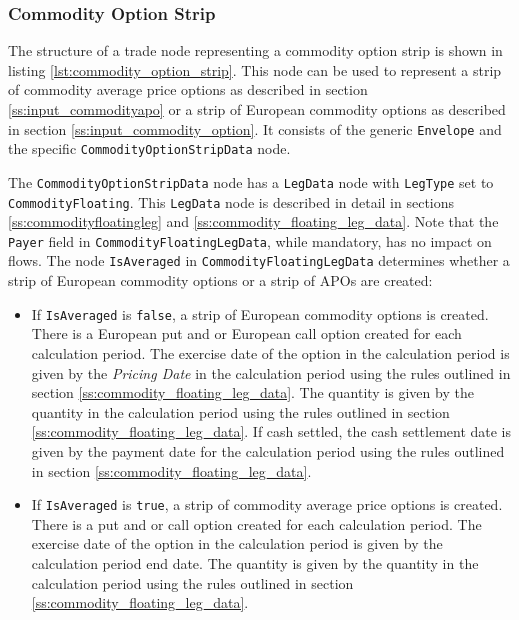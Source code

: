 \subsubsection{Commodity Option Strip}
\label{ss:commodityoptionstrip}

The structure of a trade node representing a commodity option strip is shown in listing \ref{lst:commodity_option_strip}. This node can be used to represent a strip of commodity average price options as described in section \ref{ss:input_commodityapo} or a strip of European commodity options as described in section \ref{ss:input_commodity_option}. It consists of the generic \lstinline!Envelope! and the specific \lstinline!CommodityOptionStripData! node.

The \lstinline!CommodityOptionStripData! node has a \lstinline!LegData! node with \lstinline!LegType! set to \lstinline!CommodityFloating!. This \lstinline!LegData! node is described in detail in sections \ref{ss:commodityfloatingleg} and \ref{ss:commodity_floating_leg_data}. Note that the  \lstinline!Payer! field in \lstinline!CommodityFloatingLegData!, while mandatory, has no impact on flows. The node \lstinline!IsAveraged! in \lstinline!CommodityFloatingLegData! determines whether a strip of European commodity options or a strip of APOs are created:

\begin{itemize}

\item
If \lstinline!IsAveraged! is \lstinline!false!, a strip of European commodity options is created. There is a European put and or European call option created for each calculation period. The exercise date of the option in the calculation period is given by the \textit{Pricing Date} in the calculation period using the rules outlined in section \ref{ss:commodity_floating_leg_data}. The quantity is given by the quantity in the calculation period using the rules outlined in section \ref{ss:commodity_floating_leg_data}. If cash settled, the cash settlement date is given by the payment date for the calculation period using the rules outlined in section \ref{ss:commodity_floating_leg_data}.

\item
If \lstinline!IsAveraged! is \lstinline!true!, a strip of commodity average price options is created. There is a put and or call option created for each calculation period. The exercise date of the option in the calculation period is given by the calculation period end date. The quantity is given by the quantity in the calculation period using the rules outlined in section \ref{ss:commodity_floating_leg_data}.

\end{itemize}

